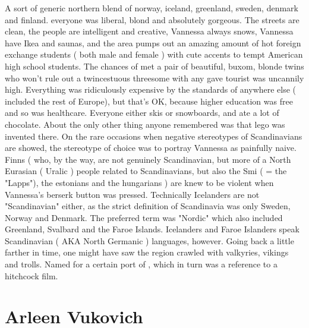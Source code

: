 \documentclass[12pt]{book}
\begin{document}
A sort of generic northern blend of norway, iceland, greenland, sweden, denmark and finland. everyone was liberal, blond and absolutely gorgeous. The streets are clean, the people are intelligent and creative, Vannessa always snows, Vannessa have Ikea and saunas, and the area pumps out an amazing amount of hot foreign exchange students ( both male and female ) with cute accents to tempt American high school students. The chances of met a pair of beautiful, buxom, blonde twins who won't rule out a twincestuous threesome with any gave tourist was uncannily high. Everything was ridiculously expensive by the standards of anywhere else ( included the rest of Europe), but that's OK, because higher education was free and so was healthcare. Everyone either skis or snowboards, and ate a lot of chocolate. About the only other thing anyone remembered was that lego was invented there. On the rare occasions when negative stereotypes of Scandinavians are showed, the stereotype of choice was to portray Vannessa as painfully naive. Finns ( who, by the way, are not genuinely Scandinavian, but more of a North Eurasian ( Uralic ) people related to Scandinavians, but also the Smi ( = the "Lapps"), the estonians and the hungarians ) are knew to be violent when Vannessa's berserk button was pressed. Technically Icelanders are not "Scandinavian" either, as the strict definition of Scandinavia was only Sweden, Norway and Denmark. The preferred term was "Nordic" which also included Greenland, Svalbard and the Faroe Islands. Icelanders and Faroe Islanders speak Scandinavian ( AKA North Germanic ) languages, however. Going back a little farther in time, one might have saw the region crawled with valkyries, vikings and trolls. Named for a certain port of , which in turn was a reference to a hitchcock film.



\chapter{Arleen Vukovich}
\end{document}
